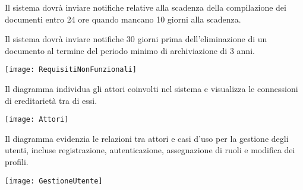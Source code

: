 \documentclass[a4paper]{report}
\begin{document}
Il sistema dovrà inviare notifiche relative alla scadenza della compilazione dei documenti entro 24 ore quando mancano 10 giorni alla scadenza.


Il sistema dovrà inviare notifiche 30 giorni prima dell'eliminazione di un documento al termine del periodo minimo di archiviazione di 3 anni.

\begin{figure*}[ht]
    \centering
    \texttt{[image: RequisitiNonFunzionali]}
\end{figure*}


\clearpage
{}

\clearpage
{}

Il diagramma individua gli attori coinvolti nel sistema e visualizza le connessioni di ereditarietà tra di essi.

\begin{figure*}[ht]
    \centering
    \texttt{[image: Attori]}
\end{figure*}

\clearpage
{}

Il diagramma evidenzia le relazioni tra attori e casi d’uso per la gestione degli utenti, incluse registrazione, autenticazione, assegnazione di ruoli e modifica dei profili.

\begin{figure*}[ht]
    \centering
    \texttt{[image: GestioneUtente]}
\end{figure*}
\end{document}
